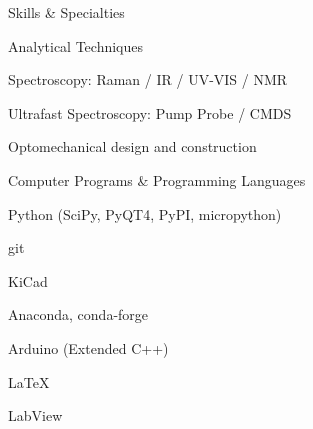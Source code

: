 \documentclass{resume}  %
\begin{document}
\begin{rSection}{Skills \& Specialties}
  \begin{rSubsection}{Analytical Techniques}{}{}{}
    \item Spectroscopy: Raman / IR / UV-VIS / NMR
    \item Ultrafast Spectroscopy: Pump Probe / CMDS
    \item Optomechanical design and construction
  \end{rSubsection}
  \begin{rSubsection}{Computer Programs \& Programming Languages}{}{}{}
    \item Python (SciPy, PyQT4, PyPI, micropython)
    \item git
    \item KiCad
    \item Anaconda, conda-forge
    \item Arduino (Extended C++)
    \item LaTeX
    \item LabView
  \end{rSubsection}
\end{rSection}

\pagebreak
\end{document}

